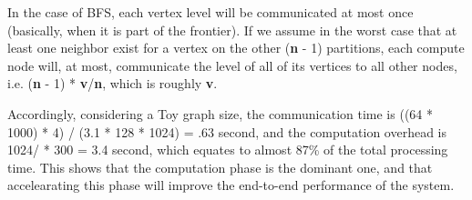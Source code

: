 In the case of BFS, each vertex level will be communicated at most once (basically, when it is part of the frontier). If we assume in the worst case that at least one neighbor exist for a vertex on the other ({\bf n} - 1) partitions, each compute node will, at most, communicate the level of all of its vertices to all other nodes, i.e. ({\bf n} - 1) * {\bf v}/{\bf n}, which is roughly {\bf v}. 

Accordingly, considering a Toy graph size, the communication time is ((64 * 1000) * 4) / (3.1 * 128 * 1024) = .63 second, and the computation overhead is 1024/ * 300 = 3.4 second, which equates to almost 87\% of the total processing time. This shows that the computation phase is the dominant one, and that accelearating this phase will improve the end-to-end performance of the system.